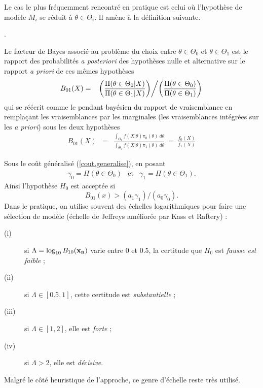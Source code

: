  
 Le cas le plus fréquemment rencontré en pratique est celui où l'hypothèse de modèle $M_i$ se réduit à $\theta\in\Theta_i$. Il amène à la définition suivante.
 


. 

\begin{definition}
Le \textcolor{black}{facteur de Bayes} associé au problème du choix entre $\theta\in\Theta_0$ et $\theta\in\Theta_1$ est le rapport des probabilités {\it a posteriori} des hypothèses nulle et alternative sur le rapport {\it a priori} de ces m\^emes hypothèses
\begin{eqnarray}
B_{01}(X) & = & \left.\left(\frac{\Pi(\theta\in\Theta_0|X)}{\Pi(\theta\in\Theta_1|X)}\right) \middle/ \left(\frac{\Pi(\theta\in\Theta_0)}{\Pi(\theta\in\Theta_1)}\right)\right. \label{facteur.bayes.3}
\end{eqnarray} 
qui se réécrit comme le \textcolor{black}{pendant bayésien du rapport de vraisemblance} en rempla\c cant les vraisemblances par les \textcolor{black}{marginales} (les vraisemblances intégrées sur les {\it a priori}) sous les deux hypothèses
\begin{eqnarray*}
B_{01}(X) & = & \frac{\int_{\Theta_0} f(X|\theta) \pi_0(\theta) \ d\theta}{\int_{\Theta_1} f(X|\theta) \pi_1(\theta) \ d\theta} \ = \ \frac{f_0(X)}{f_1(X)}
\end{eqnarray*}
\end{definition}

\vs Sous le co\^ut généralisé (\ref{cout.generalise}), en posant
\begin{eqnarray*}
\gamma_0 = \Pi(\theta\in\Theta_0) & \text{et} & \gamma_1 = \Pi(\theta\in\Theta_1).
\end{eqnarray*}
Ainsi l'hypothèse $H_0$ est acceptée si 
$$
B_{01}(x)   >  (a_1\gamma_1)/(a_0\gamma_0).
$$
Dans le pratique, on utilise souvent des échelles logarithmiques pour faire une sélection de modèle (échelle de Jeffreys améliorée par Kass et Raftery) :
\begin{description}
\item[(i)]   si $\Lambda=\log_{10} B_{10}({\bf x_n})$ varie entre 0 et 0.5, la certitude que $H_0$ est {\it fausse est faible} ;
\item[(ii)]  si $\Lambda\in[0.5,1]$, cette certitude est {\it substantielle} ;
\item[(iii)] si $\Lambda\in[1,2]$, elle est {\it forte} ;
\item[(iv)]  si $\Lambda>2$, elle est {\it décisive}.
\end{description}
Malgré le c\^oté heuristique de l'approche, ce genre d'échelle reste très utilisé. \\

